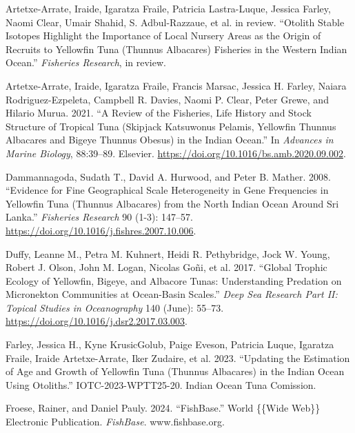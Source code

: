 \documentclass[
]{scrartcl}
\newlength{\cslhangindent}
\newenvironment{CSLReferences}[2] %
 {\begin{list}{}{%
  \setlength{\itemindent}{0pt}
  \setlength{\leftmargin}{0pt}
  \setlength{\parsep}{0pt}
  \ifodd #1
   \setlength{\leftmargin}{\cslhangindent}
   \setlength{\itemindent}{-1\cslhangindent}
  \fi
  \setlength{\itemsep}{#2\baselineskip}}}
 {\end{list}}
\begin{document}
\label{refs}
\begin{CSLReferences}{1}{0}
Artetxe-Arrate, Iraide, Igaratza Fraile, Patricia Lastra-Luque, Jessica
Farley, Naomi Clear, Umair Shahid, S. Adbul-Razzaue, et al. in review.
{``Otolith Stable Isotopes Highlight the Importance of Local Nursery
Areas as the Origin of Recruits to Yellowfin Tuna ({Thunnus} Albacares)
Fisheries in the Western {Indian Ocean}.''} \emph{Fisheries Research},
in review.

Artetxe-Arrate, Iraide, Igaratza Fraile, Francis Marsac, Jessica H.
Farley, Naiara Rodriguez-Ezpeleta, Campbell R. Davies, Naomi P. Clear,
Peter Grewe, and Hilario Murua. 2021. {``A Review of the Fisheries, Life
History and Stock Structure of Tropical Tuna (Skipjack {Katsuwonus}
Pelamis, Yellowfin {Thunnus} Albacares and Bigeye {Thunnus} Obesus) in
the {Indian Ocean}.''} In \emph{Advances in {Marine Biology}},
88:39--89. Elsevier. \url{https://doi.org/10.1016/bs.amb.2020.09.002}.

Dammannagoda, Sudath T., David A. Hurwood, and Peter B. Mather. 2008.
{``Evidence for Fine Geographical Scale Heterogeneity in Gene
Frequencies in Yellowfin Tuna ({Thunnus} Albacares) from the North
{Indian Ocean} Around {Sri Lanka}.''} \emph{Fisheries Research} 90
(1-3): 147--57. \url{https://doi.org/10.1016/j.fishres.2007.10.006}.

Duffy, Leanne M., Petra M. Kuhnert, Heidi R. Pethybridge, Jock W. Young,
Robert J. Olson, John M. Logan, Nicolas Goñi, et al. 2017. {``Global
Trophic Ecology of Yellowfin, Bigeye, and Albacore Tunas:
{Understanding} Predation on Micronekton Communities at Ocean-Basin
Scales.''} \emph{Deep Sea Research Part II: Topical Studies in
Oceanography} 140 (June): 55--73.
\url{https://doi.org/10.1016/j.dsr2.2017.03.003}.

Farley, Jessica H., Kyne KrusicGolub, Paige Eveson, Patricia Luque,
Igaratza Fraile, Iraide Artetxe-Arrate, Iker Zudaire, et al. 2023.
{``Updating the Estimation of Age and Growth of Yellowfin Tuna
({Thunnus} Albacares) in the {Indian Ocean} Using Otoliths.''}
IOTC-2023-WPTT25-20. Indian Ocean Tuna Comission.

Froese, Rainer, and Daniel Pauly. 2024. {``{FishBase}.''} World \{\{Wide
Web\}\} Electronic Publication. \emph{FishBase}. www.fishbase.org.


\end{CSLReferences}
\end{document}
